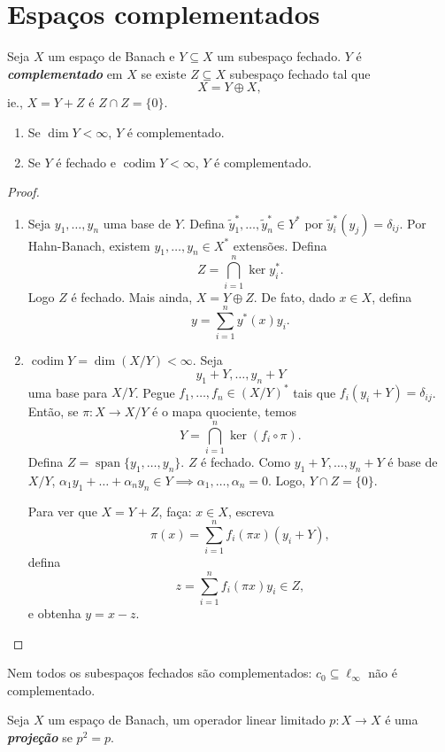 \documentclass[portuguese]{article}
\theoremstyle{definition}
\begin{document}
\section{Espaços complementados}
\begin{defn}
	Seja $X$ um espaço de Banach e $Y\subseteq X$ um subespaço fechado. $Y$ é \textbf{\textit{complementado}} em $X$ se existe $Z\subseteq X$ subespaço fechado tal que
	\[X=Y\oplus X,\]
	ie., $X=Y+Z$ é $Z\cap Z=\{0\}$.
\end{defn}
\begin{prop}\leavevmode
	\begin{enumerate}
		\item Se $\dim Y<\infty$, $Y$ é complementado.
		\item Se $Y$ é fechado e $\operatorname{codim}Y<\infty$, $Y$ é complementado.
	\end{enumerate}
\end{prop}
\begin{proof}\leavevmode
	\begin{enumerate}
		\item Seja $y_1,\ldots,y_n$ uma base de $Y$. Defina $\tilde{y}^*_1,\ldots,\tilde{y}_n^*\in Y^*$ por $\tilde{y}_i^*(y_j)=\delta_{ij}$. Por Hahn-Banach, existem $y_1,\ldots,y_n\in X^*$ extensões. Defina
		\[Z=\bigcap_{i=1}^n\ker y^*_i.\]
		Logo $Z$ é fechado. Mais ainda, $X=Y\oplus Z$. De fato, dado $x\in X$, defina
		\[y=\sum_{i=1}^ny^*(x)y_i.\]		
		\item $\operatorname{codim}Y=\dim\left(X/Y\right)<\infty$. Seja
		\[y_1+Y,\ldots, y_n+Y\]
		uma base para $X/Y$. Pegue $f_1,\ldots,f_n\in \left(X/Y\right)^*$ tais que $f_i(y_i+Y)=\delta_{ij}$. Então, se $\pi:X\to X/Y$ é o mapa quociente, temos
		\[Y=\bigcap_{i=1}^n\ker(f_i\circ\pi).\]
		Defina $Z=\operatorname{span}\{y_1,\ldots,y_n\}$. $Z$ é fechado. Como $y_1+Y,\ldots,y_n+Y$ é base de $X/Y$, $\alpha_1y_1+\ldots+\alpha_ny_n\in Y\implies \alpha_1,\ldots,\alpha_n=0$. Logo, $Y\cap Z=\{0\}$.
		
		Para ver que $X=Y+Z$, faça: $x\in X$, escreva
		\[\pi (x)=\sum_{i=1}^n f_i(\pi x)(y_i+Y),\]
		defina
		\[z=\sum_{i=1}^nf_i(\pi x)y_i\in Z,\]
		e obtenha $y=x-z$.
	\end{enumerate}
\end{proof}
\begin{obs}
	Nem todos os subespaços fechados são complementados: $c_0\subseteq \ell_\infty$ não é complementado.
\end{obs}
\begin{defn}
	Seja $X$ um espaço de Banach, um operador linear limitado $p:X\to X$ é uma \textbf{\textit{projeção}} se $p^2=p$.
\end{defn}
\end{document}
